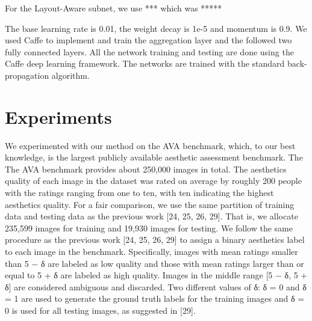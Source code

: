 \documentclass[10pt,twocolumn,letterpaper]{article}
\begin{document}
For the Layout-Aware subnet, we use *** which was *****

The base learning rate is 0.01, the weight decay is 1e-5 and momentum is 0.9.  
We used Caffe to implement and train the aggregation layer and the followed two fully connected layers.
All the network training and testing are done using the Caffe deep learning framework. The networks are trained with the standard back-propagation algorithm.

\section{Experiments}
We experimented with our method on the AVA benchmark, which, to our best knowledge, is the largest publicly available aesthetic assessment benchmark. The The AVA
benchmark provides about 250,000 images in total. The
aesthetics quality of each image in the dataset was rated
on average by roughly 200 people with the ratings ranging
from one to ten, with ten indicating the highest aesthetics
quality. For a fair comparison, we use the same
partition of training data and testing data as the previous
work [24, 25, 26, 29]. That is, we allocate 235,599 images
for training and 19,930 images for testing.
We follow the same procedure as the previous work [24,
25, 26, 29] to assign a binary aesthetics label to each image
in the benchmark. Specifically, images with mean ratings
smaller than 5 − δ are labeled as low quality and those with
mean ratings larger than or equal to 5 + δ are labeled as
high quality. Images in the middle range [5 − δ, 5 + δ] are
considered ambiguous and discarded. Two different values
of δ: δ = 0 and δ = 1 are used to generate the ground
truth labels for the training images and δ = 0 is used for all
testing images, as suggested in [29].
 




%
\end{document}
